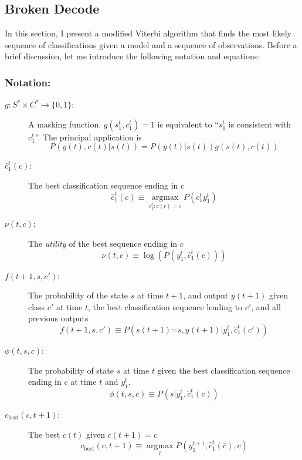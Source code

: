 \documentclass[]{article}
\newcommand{\ts}[3]{#1_{#2}^{#3}}                    %
\newcommand{\argmax}{\operatorname*{argmax}}
\newcommand{\ti}[2]{{#1}{(#2)}}                  %
\newcommand{\cbest}{c_{\text{best}}}
\newcommand{\is}{\texttt{=}}
\begin{document}
\subsection{Broken Decode}\label{sec:broken_decode}

In this section, I present a modified Viterbi
algorithm that finds the most likely sequence of classifications given
a model and a sequence of observations.  Before a brief discussion,
let me introduce the following notation and equations:
\subsubsection*{Notation:}
\begin{description}
\item[$g:S^*\times C^* \mapsto \{0,1\}$:] A masking function,
  $g(\ts{s}{1}{t},\ts{c}{1}{t}) = 1$ is equivalent to ``$\ts{s}{1}{t}$ is
  consistent with $\ts{c}{1}{t}$''.  The principal application is
  \begin{equation}\label{eq:maskedLikelihood}
    P_{} \left(\ti{y}{t},\ti{c}{t}|\ti{s}{t} \right) =  P_{}
    \left(\ti{y}{t}|\ti{s}{t} \right) g(\ti{s}{t},\ti{c}{t})
  \end{equation}
\item[$ \ts{\hat c}{1}{t} (c)$:] The best classification sequence ending
  in $c$
  \begin{equation*}
     \ts{\hat c}{1}{t} (c) \equiv \argmax_{\ts{c}{1}{t}:\ti{c}{t}=c}
     P\left(\ts{c}{1}{t}\ts{y}{1}{t}\right)
  \end{equation*}
\item[$\nu(t,c)$:] The \emph{utility} of the best sequence ending in $c$
  \begin{equation*}
    \nu(t,c) \equiv \log\left(P_{} \left(\ts{y}{1}{t},\ts{\hat c}{1}{t}(c)
      \right) \right)
  \end{equation*}
\item[$f(t+1,s,c')$:] The probability of the state $s$ at time $t+1$,
  and output $y(t+1)$ given class $c'$ at time $t$, the best
  classification sequence leading to $c'$, and all previous outputs
  \begin{equation*}
    f(t+1,s,c') \equiv  P\left(\ti{s}{t+1}\is s,\ti{y}{t+1} | y_1^{t}, \ts{\hat c}{1}{t}(c')\right)
  \end{equation*}
\item[$\phi(t,s,c)$:] The probability of state $s$ at time $t$ given
  the best classification sequence ending in $c$ at time $t$ and
  $\ts{y}{1}{t}$.
  \begin{equation*}
    \phi(t,s,c) \equiv P_{} \left(s|\ts{y}{1}{t},\ts{\hat c}{1}{t}(c) \right)
  \end{equation*}
\item[$\cbest\left(c,t+1\right)$:] The best $\ti{c}{t}$ given $\ti{c}{t+1}=c$
  \begin{equation}\label{eq:cbest}
    \cbest\left(c,t+1\right) \equiv \argmax_{\bar c} P_{}
    \left(\ts{y}{1}{t+1},\ts{\hat c}{1}{t}(\bar c),c \right)
  \end{equation}
\end{description}
\end{document}
